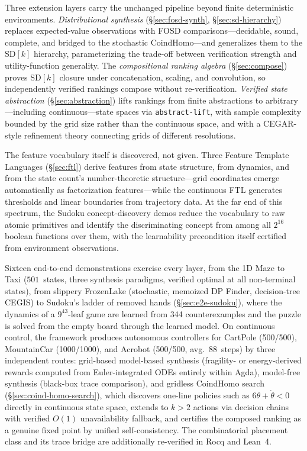 \documentclass[9pt,a4paper]{article}
\theoremstyle{plain}
\theoremstyle{definition}
\theoremstyle{remark}
\begin{document}
Three extension layers carry the unchanged pipeline beyond finite deterministic environments.  \emph{Distributional synthesis} (\S\ref{sec:fosd-synth}, \S\ref{sec:sd-hierarchy}) replaces expected-value observations with FOSD comparisons---decidable, sound, complete, and bridged to the stochastic CoindHomo---and generalizes them to the SD$[k]$ hierarchy, parameterizing the trade-off between verification strength and utility-function generality.  The \emph{compositional ranking algebra} (\S\ref{sec:compose}) proves SD$[k]$ closure under concatenation, scaling, and convolution, so independently verified rankings compose without re-verification.  \emph{Verified state abstraction} (\S\ref{sec:abstraction}) lifts rankings from finite abstractions to arbitrary---including continuous---state spaces via \texttt{abstract-lift}, with sample complexity bounded by the grid size rather than the continuous space, and with a CEGAR-style refinement theory connecting grids of different resolutions.

The feature vocabulary itself is discovered, not given.  Three Feature Template Languages (\S\ref{sec:ftl}) derive features from state structure, from dynamics, and from the state count's number-theoretic structure---grid coordinates emerge automatically as factorization features---while the continuous FTL generates thresholds and linear boundaries from trajectory data.  At the far end of this spectrum, the Sudoku concept-discovery demos reduce the vocabulary to raw atomic primitives and identify the discriminating concept from among all $2^{16}$ boolean functions over them, with the learnability precondition itself certified from environment observations.

Sixteen end-to-end demonstrations exercise every layer, from the 1D Maze to Taxi ($501$~states, three synthesis paradigms, verified optimal at all non-terminal states), from slippery FrozenLake (stochastic, memoized DP Finder, decision-tree CEGIS) to Sudoku's ladder of removed hands (\S\ref{sec:e2e-sudoku}), where the dynamics of a $9^{43}$-leaf game are learned from 344 counterexamples and the puzzle is solved from the empty board through the learned model.  On continuous control, the framework produces autonomous controllers for CartPole (500/500), MountainCar (1000/1000), and Acrobot (500/500, avg.\ 88~steps) by three independent routes: grid-based model-based synthesis (fragility- or energy-derived rewards computed from Euler-integrated ODEs entirely within Agda), model-free synthesis (black-box trace comparison), and gridless CoindHomo search (\S\ref{sec:coind-homo-search}), which discovers one-line policies such as $6\theta + \dot\theta < 0$ directly in continuous state space, extends to $k > 2$ actions via decision chains with verified $O(1)$ unavailability fallback, and certifies the composed ranking as a genuine fixed point by unified self-consistency.  The combinatorial placement class and its trace bridge are additionally re-verified in Rocq and Lean~4.
\end{document}
